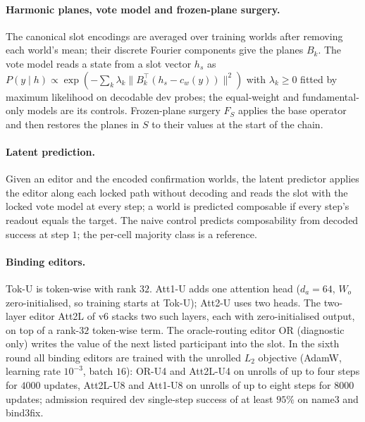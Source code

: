 \paragraph{Harmonic planes, vote model and frozen-plane surgery.}
The canonical slot encodings are averaged over training worlds after removing each world's mean; their discrete Fourier components give
the planes $B_k$. The vote model reads a state from a slot vector $h_s$ as
$P(y\mid h) \propto \exp(-\sum_k \lambda_k \lVert B_k^\top(h_s - c_w(y))\rVert^2)$ with $\lambda_k \ge 0$ fitted by maximum likelihood on
decodable dev probes; the equal-weight and fundamental-only models are its controls. Frozen-plane surgery $F_S$ applies the base
operator and then restores the planes in $S$ to their values at the start of the chain.

\paragraph{Latent prediction.}
Given an editor and the encoded confirmation worlds, the latent predictor applies the editor along each locked path without decoding and
reads the slot with the locked vote model at every step; a world is predicted composable if every step's readout equals the target.
The naive control predicts composability from decoded success at step $1$; the per-cell majority class is a reference.

\paragraph{Binding editors.}
Tok-U is token-wise with rank $32$. Att1-U adds one attention head ($d_a = 64$, $W_o$ zero-initialised, so training starts at Tok-U);
Att2-U uses two heads. The two-layer editor Att2L of v6 stacks two such layers, each with zero-initialised output, on top of a rank-$32$
token-wise term. The oracle-routing editor OR (diagnostic only) writes the value of the next listed participant into the slot.
In the sixth round all binding editors are trained with the unrolled $L_2$ objective (AdamW, learning rate $10^{-3}$, batch $16$):
OR-U4 and Att2L-U4 on unrolls of up to four steps for $4000$ updates, Att2L-U8 and Att1-U8 on unrolls of up to eight steps for
$8000$ updates; admission required dev single-step success of at least $95\%$ on name3 and bind3fix.


